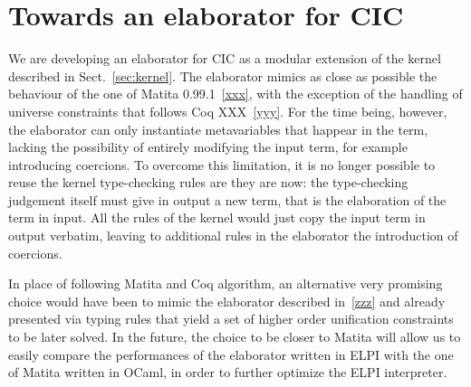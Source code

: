 \documentclass{easychair}
\begin{document}
\section{Towards an elaborator for CIC}\label{sec:elaborator}
We are developing an elaborator for CIC as a modular extension of the kernel described in Sect.~\ref{sec:kernel}. The elaborator mimics as close as possible the behaviour of the one of Matita 0.99.1~\ref{xxx}, with the exception of the handling of universe constraints that follows Coq XXX~\ref{yyy}. For the time being, however, the elaborator can only instantiate metavariables that happear in the term, lacking the possibility of entirely modifying the input term, for example introducing coercions. To overcome this limitation, it is no longer possible to reuse the kernel type-checking rules are they are now: the type-checking judgement itself must give in output a new term, that is the elaboration of the term in input. All the rules of the kernel would just copy the input term in output verbatim, leaving to additional rules in the elaborator the introduction of coercions.

In place of following Matita and Coq algorithm, an alternative very promising choice would have been to mimic the elaborator described in~\ref{zzz} and already presented via typing rules that yield a set of higher order unification constraints to be later solved. In the future, the choice to be closer to Matita will allow us to easily compare the performances of the elaborator written in ELPI with the one of Matita written in OCaml, in order to further optimize the ELPI interpreter.
\end{document}
